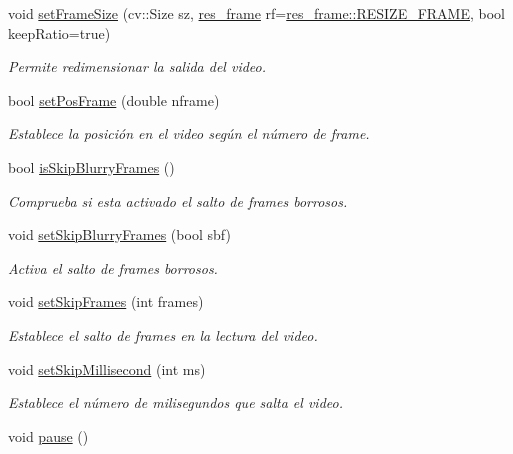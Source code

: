 \begin{DoxyCompactItemize}
void \hyperlink{class_i3_d_1_1_video_stream_a636dc0156e0171f8a106a3dd620ffe7d}{set\+Frame\+Size} (cv\+::\+Size sz, \hyperlink{namespace_i3_d_a2952d5af44b39c5dfe7e0344e012c479}{res\+\_\+frame} rf=\hyperlink{namespace_i3_d_a2952d5af44b39c5dfe7e0344e012c479ac7d706ac3ce91240180fad0ce2935596}{res\+\_\+frame\+::\+R\+E\+S\+I\+Z\+E\+\_\+\+F\+R\+A\+ME}, bool keep\+Ratio=true)
\begin{DoxyCompactList}\small\item\em Permite redimensionar la salida del video. \end{DoxyCompactList}\item 
bool \hyperlink{class_i3_d_1_1_video_stream_a1ab06a57959461b3f7e55f31728eb0b7}{set\+Pos\+Frame} (double nframe)
\begin{DoxyCompactList}\small\item\em Establece la posición en el video según el número de frame. \end{DoxyCompactList}\item 
bool \hyperlink{class_i3_d_1_1_video_stream_adffaad173983a8b1e6785d391f7a24f8}{is\+Skip\+Blurry\+Frames} ()
\begin{DoxyCompactList}\small\item\em Comprueba si esta activado el salto de frames borrosos. \end{DoxyCompactList}\item 
void \hyperlink{class_i3_d_1_1_video_stream_a1cdf99b229663f4a108bc1f12878b7ca}{set\+Skip\+Blurry\+Frames} (bool sbf)
\begin{DoxyCompactList}\small\item\em Activa el salto de frames borrosos. \end{DoxyCompactList}\item 
void \hyperlink{class_i3_d_1_1_video_stream_a601c01974a67db7a005a49fd89bcaf38}{set\+Skip\+Frames} (int frames)
\begin{DoxyCompactList}\small\item\em Establece el salto de frames en la lectura del video. \end{DoxyCompactList}\item 
void \hyperlink{class_i3_d_1_1_video_stream_a1366a8325fd874eb5f38e9fe438f0933}{set\+Skip\+Millisecond} (int ms)
\begin{DoxyCompactList}\small\item\em Establece el número de milisegundos que salta el video. \end{DoxyCompactList}\item 
void \hyperlink{class_i3_d_1_1_video_stream_a7907f00bb0f577a2768ed50eae0cf868}{pause} ()

\end{DoxyCompactItemize}
